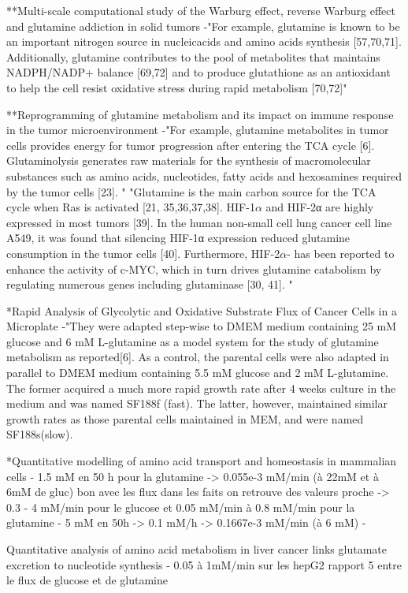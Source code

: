 \documentclass[11pt,a4paper]{article}
\begin{document}
**Multi-scale computational study of the Warburg effect, reverse Warburg effect and glutamine addiction in solid tumors
-"For example, glutamine is known to be an important nitrogen source in nucleicacids and amino acids synthesis [57,70,71]. Additionally, glutamine contributes to the pool of metabolites that maintains NADPH/NADP+ balance [69,72] and to produce glutathione as an antioxidant to help the cell resist oxidative stress during rapid metabolism [70,72]"

**Reprogramming of glutamine metabolism and its impact on immune response in the tumor microenvironment
-"For example, glutamine metabolites in tumor cells provides energy for tumor progression after entering the TCA cycle [6]. Glutaminolysis generates raw materials for the synthesis of macromolecular substances such as amino acids, nucleotides, fatty acids and hexosamines required by the tumor cells [23]. "
"Glutamine is the main carbon source for the TCA cycle when Ras is activated [21, 35,36,37,38]. HIF-1$\alpha$ and HIF-2α are highly expressed in most tumors [39]. In the human non-small cell lung cancer cell line A549, it was found that silencing HIF-1α expression reduced glutamine consumption in the tumor cells [40]. Furthermore, HIF-2$\alpha$- has been reported to enhance the activity of c-MYC, which in turn drives glutamine catabolism by regulating numerous genes including glutaminase [30, 41]. "


*Rapid Analysis of Glycolytic and Oxidative Substrate Flux
of Cancer Cells in a Microplate
-"They were adapted step-wise to DMEM medium containing 25 mM glucose and 6 mM L-glutamine as a model system for the study of glutamine metabolism as reported[6]. As a control, the parental cells were also adapted in parallel to
DMEM medium containing 5.5 mM glucose and 2 mM L-glutamine. The former acquired a much more rapid growth rate after 4 weeks culture in the medium and was named SF188f (fast). The latter, however, maintained similar growth rates as those parental cells maintained in MEM, and were named SF188s(slow).

*Quantitative modelling of amino acid transport and homeostasis in mammalian cells
- 1.5 mM en 50 h pour la glutamine -> 0.055e-3 mM/min (à 22mM et à 6mM de gluc) bon avec les flux dans les faits on retrouve des valeurs proche -> 0.3 - 4 mM/min pour le glucose et 0.05 mM/min à 0.8 mM/min pour la glutamine
- 5 mM en 50h -> 0.1 mM/h  -> 0.1667e-3 mM/min  (à 6 mM)
-

Quantitative analysis of amino acid metabolism in liver cancer links glutamate excretion to nucleotide synthesis
- 0.05 à 1mM/min sur les hepG2 rapport 5 entre le flux de glucose et de glutamine
\end{document}
